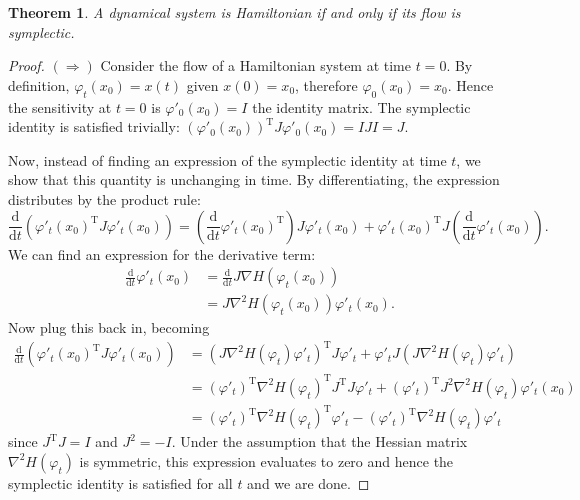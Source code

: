 \documentclass{report}
\newtheorem{theorem}{Theorem}[chapter]
\theoremstyle{exampstyle} \newtheorem{example}[theorem]{Example}
\theoremstyle{exampstyle} \newtheorem{remark}[theorem]{Remark}
\theoremstyle{exampstyle} \newtheorem{definition}[theorem]{Definition}
\theoremstyle{exampstyle} \newtheorem{lemma}[theorem]{Lemma}
\theoremstyle{exampstyle} \newtheorem{proposition}[theorem]{Proposition}
\begin{document}
\begin{theorem}
\label{thm:hamil}
A dynamical system is Hamiltonian if and only if its flow is symplectic.
\end{theorem}
\begin{proof}
$(\Rightarrow)$ Consider the flow of a Hamiltonian system at time $t=0$. By definition, $\varphi_t(x_0) = x(t)$ given $x(0) = x_0$,
therefore $\varphi_0(x_0) = x_0$. Hence the sensitivity at $t=0$ is $\varphi'_0(x_0) = I$ the identity matrix.
The symplectic identity is satisfied trivially: $(\varphi'_0(x_0))^\mathrm{T} J \varphi'_0(x_0) = IJI = J$.

Now, instead of finding an expression of the symplectic identity at time $t$,
we show that this quantity is unchanging in time.
By differentiating, the expression distributes by the product rule:
\begin{equation*}
	\frac{\mathrm{d}}{\mathrm{d}t} \left(
		\varphi'_t(x_0)^\mathrm{T} J \varphi'_t(x_0)
	\right) = \left(
		\frac{\mathrm{d}}{\mathrm{d}t} \varphi'_t(x_0)^\mathrm{T}
	\right) J \varphi'_t(x_0) + \varphi'_t(x_0)^\mathrm{T} J \left(
		\frac{\mathrm{d}}{\mathrm{d}t} \varphi'_t(x_0)
	\right).
\end{equation*}
We can find an expression for the derivative term:
\begin{align*}
	\frac{\mathrm{d}}{\mathrm{d}t} \varphi'_t(x_0) &= \frac{\mathrm{d}}{\mathrm{d}t} J \nabla H(\varphi_t(x_0)) \\
	&= J \nabla^2 H(\varphi_t(x_0)) \varphi'_t(x_0).
\end{align*}
Now plug this back in, becoming
\begin{align*}
	\frac{\mathrm{d}}{\mathrm{d}t} \left(
		\varphi'_t(x_0)^\mathrm{T} J \varphi'_t(x_0)
	\right) &= \left( J \nabla^2 H(\varphi_t)\varphi'_t \right)^\mathrm{T} J \varphi'_t 
	+ \varphi'_t J \left( 
		J \nabla^2 H(\varphi_t) \varphi'_t
  	\right) \\
	&= (\varphi'_t)^\mathrm{T} \nabla^2 H(\varphi_t)^\mathrm{T} J^\mathrm{T} J \varphi'_t
	+ (\varphi'_t)^\mathrm{T} J^2 \nabla^2 H(\varphi_t) \varphi'_t(x_0) \\
	&= (\varphi'_t)^\mathrm{T} \nabla^2 H(\varphi_t)^\mathrm{T} \varphi'_t - (\varphi'_t)^\mathrm{T} \nabla^2 H(\varphi_t) \varphi'_t
\end{align*}
since $J^\mathrm{T}J = I$ and $J^2 = -I$.
Under the assumption that the Hessian matrix $\nabla^2 H(\varphi_t)$ is symmetric,
this expression evaluates to zero and hence the symplectic identity is satisfied for all $t$ and we are done.


\end{proof}
\end{document}

